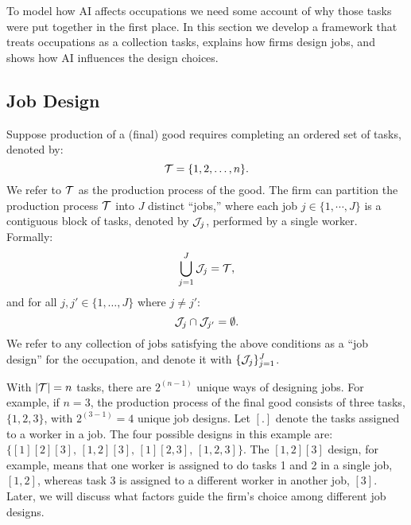 \documentclass{article}
\theoremstyle{plain}
\theoremstyle{plain}
\begin{document}
To model how AI affects occupations we need some account of why those tasks were put together in the first place.
In this section we develop a framework that treats occupations as a collection tasks, explains how firms design jobs, and shows how AI influences the design choices.


\subsection{Job Design}
\label{sec:job_design}

Suppose production of a (final) good requires completing an ordered set of tasks, denoted by:
\begin{equation}
\label{eq:tasks}
\mathcal{T} = \{1,2,\ldots,n\}.
\end{equation}
We refer to $\mathcal{T}$ as the production process of the good.
The firm can partition the production process $\mathcal{T}$ into $J$ distinct ``jobs,'' where each job $j \in \{1, \cdots, J \}$ is a contiguous block of tasks, denoted by $\mathcal{J}_j$, performed by a single worker.
Formally:
\[
\bigcup_{j=1}^J \mathcal{J}_j = \mathcal{T}, 
\]
and for all $j,j' \in \{1,\dots,J\}$ where $j \neq j'$:
\[
\mathcal{J}_j \cap \mathcal{J}_{j'} = \emptyset.
\]
We refer to any collection of jobs satisfying the above conditions as a ``job design'' for the occupation, and denote it with $\{\mathcal{J}_j\}_{j=1}^{J}$.

With $|\mathcal{T}| = n$ tasks, there are $2^{(n - 1)}$ unique ways of designing jobs.
For example, if $n = 3$, the production process of the final good consists of three tasks, $\{1,2,3\}$, with $2^{(3-1)}=4$ unique job designs.
Let $[.]$ denote the tasks assigned to a worker in a job.
The four possible designs in this example are: $\{[1][2][3], \, [1,2][3], \, [1][2,3], \, [1,2,3]\}$.
The $[1,2][3]$ design, for example, means that one worker is assigned to do tasks 1 and 2 in a single job, $[1,2]$, whereas task 3 is assigned to a different worker in another job, $[3]$.
Later, we will discuss what factors guide the firm’s choice among different job designs.
\end{document}
